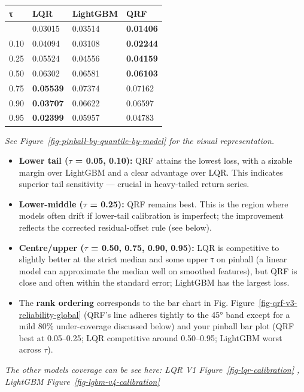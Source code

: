\documentclass[
  a4paper,
  DIV=11,
  numbers=noendperiod]{scrreprt}
\providecommand{\tightlist}{%
  \setlength{\itemsep}{0pt}\setlength{\parskip}{0pt}}
\begin{document}
\begin{longtable}[]{@{}llll@{}}
\toprule\noalign{}
τ & LQR & LightGBM & QRF \\
\midrule\noalign{}
\endhead
\bottomrule\noalign{}
\endlastfoot
0.05 & 0.03015 & 0.03514 & \textbf{0.01406} \\
0.10 & 0.04094 & 0.03108 & \textbf{0.02244} \\
0.25 & 0.05524 & 0.04556 & \textbf{0.04159} \\
0.50 & 0.06302 & 0.06581 & \textbf{0.06103} \\
0.75 & \textbf{0.05539} & 0.07374 & 0.07162 \\
0.90 & \textbf{0.03707} & 0.06622 & 0.06597 \\
0.95 & \textbf{0.02399} & 0.05957 & 0.04783 \\
\end{longtable}

\emph{See Figure~\ref{fig-pinball-by-quantile-by-model} for the visual
representation.}

\begin{itemize}
\tightlist
\item
  \textbf{Lower tail (\(\tau\) = 0.05, 0.10):} QRF attains the lowest
  loss, with a sizable margin over LightGBM and a clear advantage over
  LQR. This indicates superior tail sensitivity --- crucial in
  heavy-tailed return series.
\item
  \textbf{Lower-middle (\(\tau\) = 0.25):} QRF remains best. This is the
  region where models often drift if lower-tail calibration is
  imperfect; the improvement reflects the corrected residual-offset rule
  (see below).
\item
  \textbf{Centre/upper (\(\tau\) = 0.50, 0.75, 0.90, 0.95):} LQR is
  competitive to slightly better at the strict median and some upper τ
  on pinball (a linear model can approximate the median well on smoothed
  features), but QRF is close and often within the standard error;
  LightGBM has the largest loss.
\item
  The \textbf{rank ordering} corresponds to the bar chart in Fig.
  Figure~\ref{fig-qrf-v3-reliability-global} (QRF's line adheres tightly
  to the 45° band except for a mild 80\% under-coverage discussed below)
  and your pinball bar plot (QRF best at 0.05--0.25; LQR competitive
  around 0.50--0.95; LightGBM worst across \(\tau\)).
\end{itemize}

\emph{The other models coverage can be see here: LQR V1
Figure~\ref{fig-lqr-calibration} , LightGBM
Figure~\ref{fig-lgbm-v4-calibration}}
\end{document}
